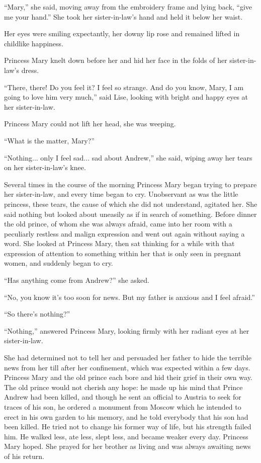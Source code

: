 ``Mary,'' she said, moving away from the embroidery frame and
lying back, ``give me your hand.'' She took her sister-in-law's
hand and held it below her waist.

Her eyes were smiling expectantly, her downy lip rose and
remained lifted in childlike happiness.

Princess Mary knelt down before her and hid her face in the folds
of her sister-in-law's dress.

``There, there! Do you feel it? I feel so strange. And do you
know, Mary, I am going to love him very much,'' said Lise,
looking with bright and happy eyes at her sister-in-law.

Princess Mary could not lift her head, she was weeping.

``What is the matter, Mary?''

``Nothing... only I feel sad... sad about Andrew,'' she said,
wiping away her tears on her sister-in-law's knee.

Several times in the course of the morning Princess Mary began
trying to prepare her sister-in-law, and every time began to
cry. Unobservant as was the little princess, these tears, the
cause of which she did not understand, agitated her. She said
nothing but looked about uneasily as if in search of
something. Before dinner the old prince, of whom she was always
afraid, came into her room with a peculiarly restless and malign
expression and went out again without saying a word. She looked
at Princess Mary, then sat thinking for a while with that
expression of attention to something within her that is only seen
in pregnant women, and suddenly began to cry.

``Has anything come from Andrew?'' she asked.

``No, you know it's too soon for news. But my father is anxious
and I feel afraid.''

``So there's nothing?''

``Nothing,'' answered Princess Mary, looking firmly with her
radiant eyes at her sister-in-law.

She had determined not to tell her and persuaded her father to
hide the terrible news from her till after her confinement, which
was expected within a few days. Princess Mary and the old prince
each bore and hid their grief in their own way. The old prince
would not cherish any hope: he made up his mind that Prince
Andrew had been killed, and though he sent an official to Austria
to seek for traces of his son, he ordered a monument from Moscow
which he intended to erect in his own garden to his memory, and
he told everybody that his son had been killed. He tried not to
change his former way of life, but his strength failed him. He
walked less, ate less, slept less, and became weaker every
day. Princess Mary hoped. She prayed for her brother as living
and was always awaiting news of his return.

